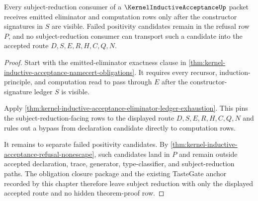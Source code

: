 \begin{theorem}
\label{thm:kernel-inductive-acceptance-subject-reduction-route}
Every subject-reduction consumer of a $\KernelInductiveAcceptanceUp$ packet receives emitted eliminator and computation rows only after the constructor signatures in $S$ are visible. Failed positivity candidates remain in the refusal row $P$, and no subject-reduction consumer can transport such a candidate into the accepted route $D,S,E,R,H,C,Q,N$.
\end{theorem}
\begin{proof}
Start with the emitted-eliminator exactness clause in \autoref{thm:kernel-inductive-acceptance-namecert-obligations}. It requires every recursor, induction-principle, and computation read to pass through $E$ after the constructor-signature ledger $S$ is visible.

Apply \autoref{thm:kernel-inductive-acceptance-eliminator-ledger-exhaustion}. This pins the subject-reduction-facing rows to the displayed route $D,S,E,R,H,C,Q,N$ and rules out a bypass from declaration candidate directly to computation rows.

It remains to separate failed positivity candidates. By \autoref{thm:kernel-inductive-acceptance-refusal-nonescape}, such candidates land in $P$ and remain outside accepted declaration, trace, generator, type-classifier, and subject-reduction paths. The obligation closure package and the existing TasteGate anchor recorded by this chapter therefore leave subject reduction with only the displayed accepted route and no hidden theorem-proof row.
\end{proof}

